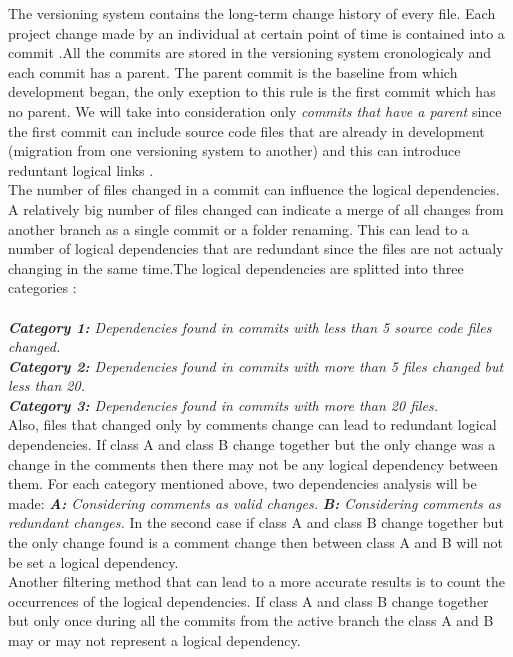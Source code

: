 \tab The versioning system contains the long-term change history of every file. Each project change made by an individual at certain point of time is contained into a commit \cite{ct7}.All the commits are stored in the versioning system cronologicaly and each commit has a parent. The parent commit is the baseline from which development began, the only exeption to this rule is the first commit which has no parent. We will take into consideration only \textit{commits that have a parent} since the first commit can include source code files that are already in development (migration from one versioning system to another) and this can introduce reduntant logical links \cite{ct8} .\\

\tab The number of files changed in a commit can influence the logical dependencies. A relatively big number of files changed can indicate a merge of all changes from another branch as a single commit or a folder renaming. This can lead to a number of logical dependencies that are redundant since the files are not actualy changing in the same time.The logical dependencies are splitted into three categories :\\ \\
\textit{\textbf{Category 1:} Dependencies found in commits with less than 5 source code files changed.}\\
\textit{\textbf{Category 2:} Dependencies found in commits with more than 5 files changed but less than 20. }\\
\textit{\textbf{Category 3:} Dependencies found in commits with more than 20 files.}\\

\tab Also, files that changed only by comments change can lead to redundant logical dependencies. If class A and class B change together but the only change was a change in the comments then there may not be any logical dependency between them. 
For each category mentioned above, two dependencies analysis will be made:
\textit{\textbf{A:} Considering comments  as valid changes.}
\textit{\textbf{B:} Considering comments  as redundant changes. }
In the second case if class A and class B change together but the only change found is a comment change then between class A and B will not be set a logical dependency.\\

\tab Another filtering method that can lead to a more accurate results is to count the occurrences of the logical dependencies. If class A and class B change together but only once during all the commits from the active branch the class A and B may or may not represent a logical dependency.
